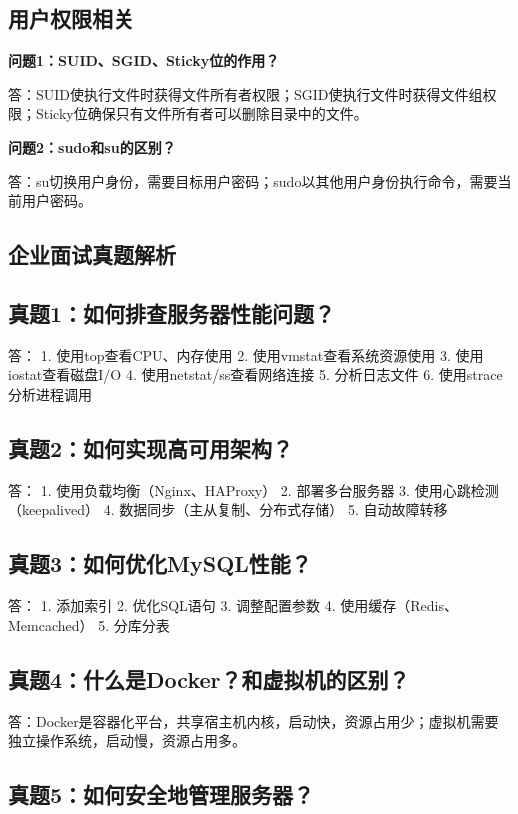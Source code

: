 \documentclass[12pt,UTF8]{ctexbook}
\begin{document}
\subsection*{用户权限相关}
\textbf{问题1：SUID、SGID、Sticky位的作用？}

答：SUID使执行文件时获得文件所有者权限；SGID使执行文件时获得文件组权限；Sticky位确保只有文件所有者可以删除目录中的文件。

\textbf{问题2：sudo和su的区别？}

答：su切换用户身份，需要目标用户密码；sudo以其他用户身份执行命令，需要当前用户密码。

\subsection*{企业面试真题解析}
\label{sec:interview-answers}

\subsection*{真题1：如何排查服务器性能问题？}

答：
1. 使用top查看CPU、内存使用
2. 使用vmstat查看系统资源使用
3. 使用iostat查看磁盘I/O
4. 使用netstat/ss查看网络连接
5. 分析日志文件
6. 使用strace分析进程调用

\subsection*{真题2：如何实现高可用架构？}

答：
1. 使用负载均衡（Nginx、HAProxy）
2. 部署多台服务器
3. 使用心跳检测（keepalived）
4. 数据同步（主从复制、分布式存储）
5. 自动故障转移

\subsection*{真题3：如何优化MySQL性能？}

答：
1. 添加索引
2. 优化SQL语句
3. 调整配置参数
4. 使用缓存（Redis、Memcached）
5. 分库分表

\subsection*{真题4：什么是Docker？和虚拟机的区别？}

答：Docker是容器化平台，共享宿主机内核，启动快，资源占用少；虚拟机需要独立操作系统，启动慢，资源占用多。

\subsection*{真题5：如何安全地管理服务器？}
\end{document}

